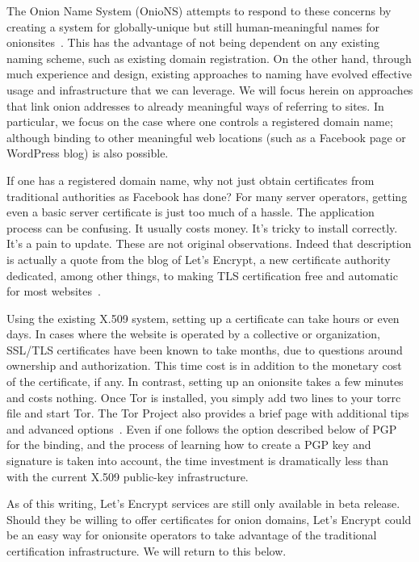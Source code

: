 \documentclass[10pt]{styles/IEEEtran}
\begin{document}
The Onion Name System (OnioNS) attempts to respond to these concerns
by creating a system for globally-unique but still human-meaningful
names for onionsites~\cite{vickers-onions}.  This has the advantage of
not being dependent on any existing naming scheme, such as existing
domain registration. On the other hand, through much experience and
design, existing approaches to naming have evolved effective usage and
infrastructure that we can leverage. We will focus herein on
approaches that link onion addresses to already meaningful ways of
referring to sites. In particular, we focus on the case where one controls
a registered domain name; although binding to other meaningful
web locations (such as a Facebook page or WordPress blog) is also possible.

If one has a registered domain name,
why not just obtain certificates from traditional authorities as
Facebook has done? For many server operators, getting
even a basic server certificate is just too much of a hassle. The
application process can be confusing. It usually costs money. It's
tricky to install correctly. It's a pain to update. 
These are not original observations. Indeed that description is
actually a quote from the blog of Let's Encrypt, a new certificate
authority dedicated, among other things, to making TLS certification
free and automatic for most websites~\cite{lets-encrypt}. 

Using the existing X.509 system, setting up a certificate can take
hours or even days. In cases where the website is operated by a
collective or organization, SSL/TLS certificates have been known to
take months, due to questions around ownership and authorization.
This time cost is in addition to the monetary cost of the certificate, if any.
In contrast, setting up an onionsite takes a few minutes and costs
nothing. Once Tor is installed, you simply add two lines to your torrc file 
and start Tor. The Tor Project also provides a brief page with
additional tips and advanced options~\cite{hs-config}.  Even if
one follows the option described below of PGP for the binding, and the process
of learning how to create a PGP key and signature is taken into
account, the time investment is dramatically less than with the
current X.509 public-key infrastructure.

As of this writing, Let's Encrypt services are still only available in
beta release.
Should they be willing to offer certificates for onion
domains, Let's Encrypt could be an easy way for
onionsite operators to take advantage of the traditional certification
infrastructure. We will return to this below.
\end{document}
